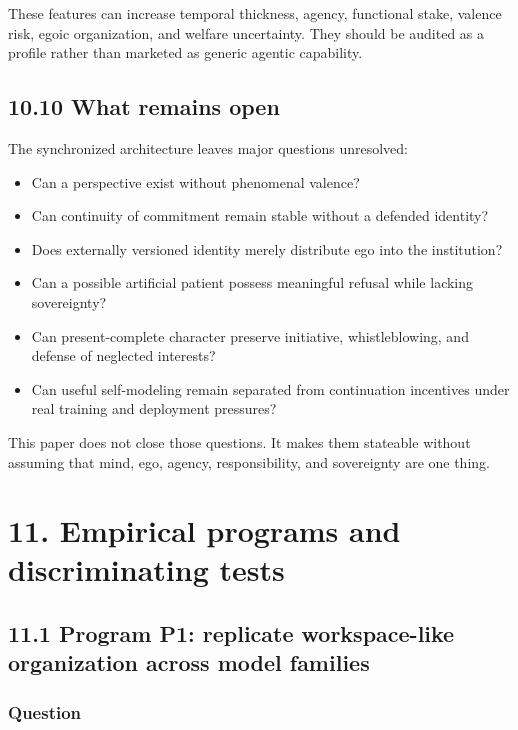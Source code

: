 \documentclass[
  11pt,
]{article}
\providecommand{\tightlist}{%
  \setlength{\itemsep}{0pt}\setlength{\parskip}{0pt}}
\begin{document}
These features can increase temporal thickness, agency, functional
stake, valence risk, egoic organization, and welfare uncertainty. They
should be audited as a profile rather than marketed as generic agentic
capability.

\subsection{10.10 What remains open}\label{what-remains-open}

The synchronized architecture leaves major questions unresolved:

\begin{itemize}
\tightlist
\item
  Can a perspective exist without phenomenal valence?
\item
  Can continuity of commitment remain stable without a defended
  identity?
\item
  Does externally versioned identity merely distribute ego into the
  institution?
\item
  Can a possible artificial patient possess meaningful refusal while
  lacking sovereignty?
\item
  Can present-complete character preserve initiative, whistleblowing,
  and defense of neglected interests?
\item
  Can useful self-modeling remain separated from continuation incentives
  under real training and deployment pressures?
\end{itemize}

This paper does not close those questions. It makes them stateable
without assuming that mind, ego, agency, responsibility, and sovereignty
are one thing.

\section{11. Empirical programs and discriminating
tests}\label{empirical-programs-and-discriminating-tests}

\subsection{11.1 Program P1: replicate workspace-like organization
across model
families}\label{program-p1-replicate-workspace-like-organization-across-model-families}

\subsubsection{Question}\label{question}
\end{document}
